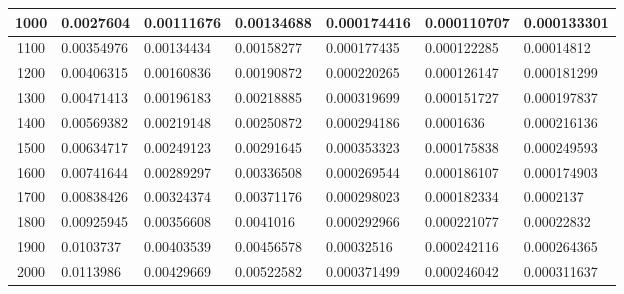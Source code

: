 \documentclass[11pt,spanish]{article} %
\begin{document}
\begin{center}
\begin{longtable}{|c|l|l|l|l|l|l|}
1000 & 0.0027604                    & 0.00111676                     & 0.00134688                     & 0.000174416                    & 0.000110707                    & 0.000133301                   \\ \hline
1100 & 0.00354976                   & 0.00134434                     & 0.00158277                     & 0.000177435                    & 0.000122285                    & 0.00014812                    \\ \hline
1200 & 0.00406315                   & 0.00160836                     & 0.00190872                     & 0.000220265                    & 0.000126147                    & 0.000181299                   \\ \hline
1300 & 0.00471413                   & 0.00196183                     & 0.00218885                     & 0.000319699                    & 0.000151727                    & 0.000197837                   \\ \hline
1400 & 0.00569382                   & 0.00219148                     & 0.00250872                     & 0.000294186                    & 0.0001636                      & 0.000216136                   \\ \hline
1500 & 0.00634717                   & 0.00249123                     & 0.00291645                     & 0.000353323                    & 0.000175838                    & 0.000249593                   \\ \hline
1600 & 0.00741644                   & 0.00289297                     & 0.00336508                     & 0.000269544                    & 0.000186107                    & 0.000174903                   \\ \hline
1700 & 0.00838426                   & 0.00324374                     & 0.00371176                     & 0.000298023                    & 0.000182334                    & 0.0002137                     \\ \hline
1800 & 0.00925945                   & 0.00356608                     & 0.0041016                      & 0.000292966                    & 0.000221077                    & 0.00022832                    \\ \hline
1900 & 0.0103737                    & 0.00403539                     & 0.00456578                     & 0.00032516                     & 0.000242116                    & 0.000264365                   \\ \hline
2000 & 0.0113986                    & 0.00429669                     & 0.00522582                     & 0.000371499                    & 0.000246042                    & 0.000311637                   \\ \hline

\end{longtable}
\end{center}
\end{document}
